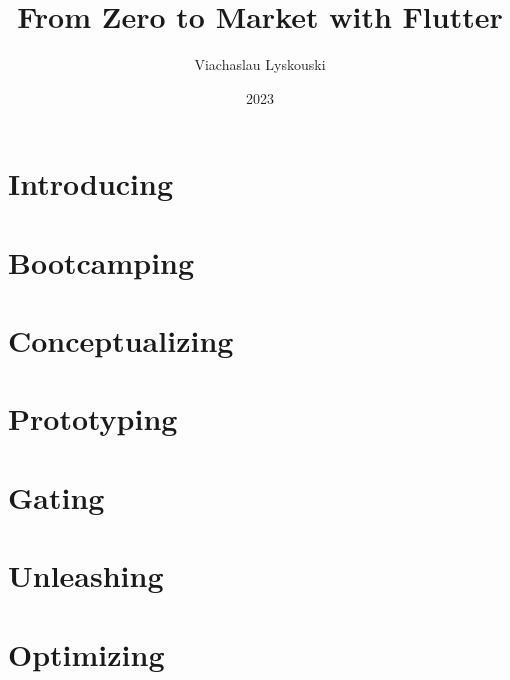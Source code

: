 \documentclass[12pt, a4paper, twoside]{extreport}
\author{Viachaslau Lyskouski}
\title{From Zero to Market with Flutter}
\date{2023}
\begin{document}




\tableofcontents

\newpage
\section*{Introducing}


\newpage
\section{Bootcamping}



\newpage
\section{Conceptualizing}


\newpage
\section{Prototyping}


\newpage





\newpage
\section{Gating}







\newpage
\section{Unleashing}







\newpage
\section{Optimizing}









\end{document}
